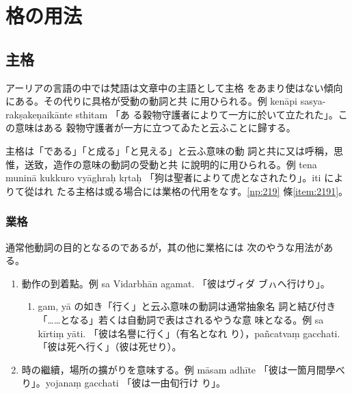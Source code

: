 \section{格の用法}
\subsection{主格}
\numberParagraph
アーリアの言語の中では梵語は文章中の主語として主格
をあまり使はない傾向にある。その代りに具格が受動の動詞と共
に用ひられる。例 kenāpi sasya-rakṣakeṇaikānte sthitam 「あ
る穀物守護者によりて一方に於いて立たれた」。この意味はある
穀物守護者が一方に立つてゐたと云ふことに歸する。

\numberParagraph
主格は「である」「と成る」「と見える」と云ふ意味の動
詞と共に又は呼稱，思惟，送致，造作の意味の動詞の受動と共
に說明的に用ひられる。例 tena muninā kukkuro vyāghraḥ
kṛtaḥ 「狗は聖者によりて虎となされたり」。iti によりて從はれ
たる主格は或る場合には業格の代用をなす。\ref{np:219} 條\ref{item:2191}。

\subsubsection{業格}
\numberParagraph
通常他動詞の目的となるのであるが，其の他に業格には
次のやうな用法がある。
\begin{enumerate}[label=(\arabic*)]
\item 動作の到着點。例 sa Vidarbhān agamat. 「彼はヴィダ
ブㇵへ行けり」。
\
\begin{enumerate}[label=(\alph*)]
\item gam, yā の如き「行く」と云ふ意味の動詞は通常抽象名
詞と結び付き「……となる」若くは自動詞で表はされるやうな意
味となる。例 sa kīrtiṃ yāti. 「彼は名譽に行く」（有名となれ
り），pañcatvaṃ gacchati. 「彼は死へ行く」（彼は死せり）。
\end{enumerate}
\item 時の繼續，場所の擴がりを意味する。例 māsam adhīte
「彼は一箇月間學べり」。yojanaṃ gacchati 「彼は一由旬行け
り」。
\end{enumerate}

